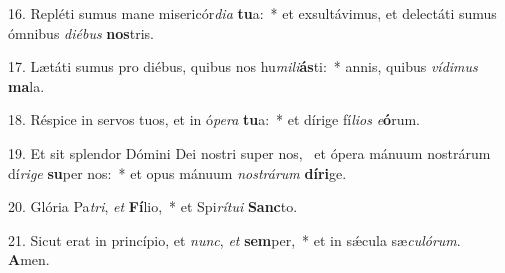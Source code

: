 16. Repléti sumus mane misericór\textit{di}\textit{a} \textbf{tu}a:~*  et exsultávimus, et delectáti sumus ómnibus \textit{di}\textit{é}\textit{bus} \textbf{nos}tris.\

17. Lætáti sumus pro diébus, quibus nos hu\textit{mi}\textit{li}\textbf{ás}ti:~*  annis, quibus \textit{ví}\textit{di}\textit{mus} \textbf{ma}la.\

18. Réspice in servos tuos, et in ó\textit{pe}\textit{ra} \textbf{tu}a:~*  et dírige fí\textit{li}\textit{os} \textit{e}\textbf{ó}rum.\

19. Et sit splendor Dómini Dei nostri super nos, \dag\  et ópera mánuum nostrárum dí\textit{ri}\textit{ge} \textbf{su}per nos:~*  et opus mánuum \textit{nos}\textit{trá}\textit{rum} \textbf{dí}\textbf{ri}ge.\

20. Glória Pa\textit{tri}, \textit{et} \textbf{Fí}lio,~*  et Spi\textit{rí}\textit{tu}\textit{i} \textbf{Sanc}to.\

21. Sicut erat in princípio, et \textit{nunc}, \textit{et} \textbf{sem}per,~*  et in sǽcula sæ\textit{cu}\textit{ló}\textit{rum}. \textbf{A}men.\

